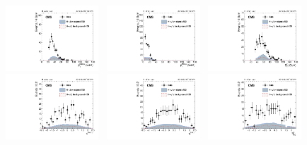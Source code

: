 		\begin{figure}[h]
		  \centering
		  \includegraphics[width=0.31\textwidth]{Fig/Final_NoPreliminary/HJpsiG/leadingMuonPt_Inclusive}~
		  \includegraphics[width=0.31\textwidth]{Fig/Final_NoPreliminary/HJpsiG/trailingMuonPt_Inclusive}~
		  \includegraphics[width=0.31\textwidth]{Fig/Final_NoPreliminary/HJpsiG/phoPt_Inclusive}\\
		  \includegraphics[width=0.31\textwidth]{Fig/Final_NoPreliminary/HJpsiG/leadingMuonEta_Inclusive}~
		  \includegraphics[width=0.31\textwidth]{Fig/Final_NoPreliminary/HJpsiG/trailingMuonEta_Inclusive}~
		  \includegraphics[width=0.31\textwidth]{Fig/Final_NoPreliminary/HJpsiG/phoSCEta_Inclusive}\\

\end{figure}
